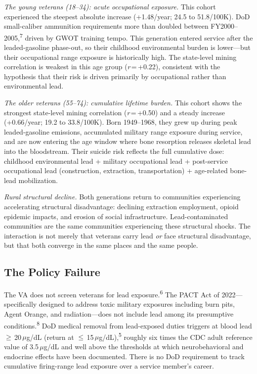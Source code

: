 \documentclass[11pt,twocolumn]{article}
\begin{document}
\textit{The young veterans (18--34): acute occupational exposure.} This cohort experienced the steepest absolute increase (+1.48/year; 24.5 to 51.8/100K). DoD small-caliber ammunition requirements more than doubled between FY2000--2005,\textsuperscript{7} driven by GWOT training tempo. This generation entered service after the leaded-gasoline phase-out, so their childhood environmental burden is lower---but their occupational range exposure is historically high. The state-level mining correlation is weakest in this age group (\textit{r}\,=\,+0.22), consistent with the hypothesis that their risk is driven primarily by occupational rather than environmental lead.

\textit{The older veterans (55--74): cumulative lifetime burden.} This cohort shows the strongest state-level mining correlation (\textit{r}\,=\,+0.50) and a steady increase (+0.66/year; 19.2 to 33.8/100K). Born 1949--1968, they grew up during peak leaded-gasoline emissions, accumulated military range exposure during service, and are now entering the age window where bone resorption releases skeletal lead into the bloodstream. Their suicide risk reflects the full cumulative dose: childhood environmental lead + military occupational lead + post-service occupational lead (construction, extraction, transportation) + age-related bone-lead mobilization.

\textit{Rural structural decline.} Both generations return to communities experiencing accelerating structural disadvantage: declining extraction employment, opioid epidemic impacts, and erosion of social infrastructure. Lead-contaminated communities are the same communities experiencing these structural shocks. The interaction is not merely that veterans carry lead \textit{or} face structural disadvantage, but that both converge in the same places and the same people.


\subsection{The Policy Failure}

The VA does not screen veterans for lead exposure.\textsuperscript{6} The PACT Act of 2022---specifically designed to address toxic military exposures including burn pits, Agent Orange, and radiation---does not include lead among its presumptive conditions.\textsuperscript{8} DoD medical removal from lead-exposed duties triggers at blood lead $\geq$\,20\,$\mu$g/dL (return at $\leq$\,15\,$\mu$g/dL),\textsuperscript{5} roughly six times the CDC adult reference value of 3.5\,$\mu$g/dL and well above the thresholds at which neurobehavioral and endocrine effects have been documented. There is no DoD requirement to track cumulative firing-range lead exposure over a service member's career.
\end{document}
